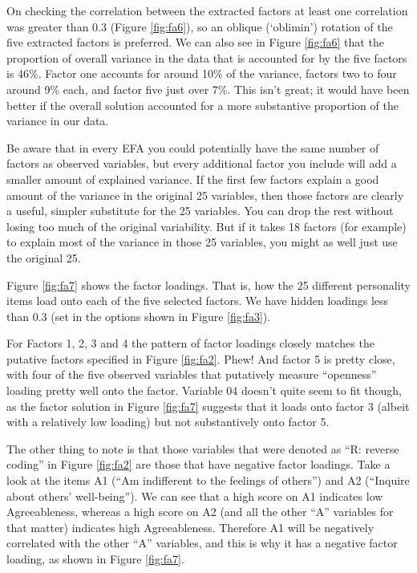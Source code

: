 On checking the correlation between the extracted factors at least one correlation was greater than 0.3 (Figure \ref{fig:fa6}), so an oblique (`oblimin') rotation of the five extracted factors is preferred. We can also see in Figure \ref{fig:fa6} that the proportion of overall variance in the data that is accounted for by the five factors is 46\%. Factor one accounts for around 10\% of the variance, factors two to four around 9\% each, and factor five just over 7\%. This isn’t great; it would have been better if the overall solution accounted for a more substantive proportion of the variance in our data.

Be aware that in every EFA you could potentially have the same number of factors as observed variables, but every additional factor you include will add a smaller amount of explained variance. If the first few factors explain a good amount of the variance in the original 25 variables, then those factors are clearly a useful, simpler substitute for the 25 variables. You can drop the rest without losing too much of the original variability. But if it takes 18 factors (for example) to explain most of the variance in those 25 variables, you might as well just use the original 25.

Figure \ref{fig:fa7} shows the factor loadings. That is, how the 25 different personality items load onto each of the five selected factors. We have hidden loadings less than 0.3 (set in the options shown in Figure \ref{fig:fa3}).
 
For Factors 1, 2, 3 and 4 the pattern of factor loadings closely matches the putative factors specified in Figure \ref{fig:fa2}. Phew! And factor 5 is pretty close, with four of the five observed variables that putatively measure “openness” loading pretty well onto the factor. Variable 04 doesn’t quite seem to fit though, as the factor solution in Figure \ref{fig:fa7} suggests that it loads onto factor 3 (albeit with a relatively low loading) but not substantively onto factor 5.

The other thing to note is that those variables that were denoted as “R: reverse coding” in Figure \ref{fig:fa2} are those that have negative factor loadings. Take a look at the items A1 (“Am indifferent to the feelings of others”) and A2 (“Inquire about others' well-being”). We can see that a high score on A1 indicates low Agreeableness, whereas a high score on A2 (and all the other “A” variables for that matter) indicates high Agreeableness. Therefore A1 will be negatively correlated with the other “A” variables, and this is why it has a negative factor loading, as shown in Figure \ref{fig:fa7}. 

